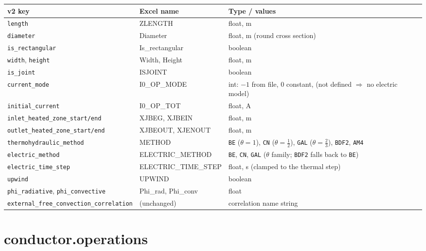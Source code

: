 \documentclass[10pt,a4paper]{article}
\newcommand{\code}[1]{\texttt{#1}}
\begin{document}
\begin{longtable}{p{4.6cm}p{3.4cm}p{7.2cm}}
\toprule
\textbf{v2 key} & \textbf{Excel name} & \textbf{Type / values} \\
\midrule
\endhead
\code{length} & ZLENGTH & float, m \\
\code{diameter} & Diameter & float, m (round cross section) \\
\code{is\_rectangular} & Is\_rectangular & boolean \\
\code{width}, \code{height} & Width, Height & float, m \\
\code{is\_joint} & ISJOINT & boolean \\
\code{current\_mode} & I0\_OP\_MODE & int: $-1$ from file, $0$ constant, (not defined $\Rightarrow$ no electric model) \\
\code{initial\_current} & I0\_OP\_TOT & float, A \\
\code{inlet\_heated\_zone\_start/\allowbreak end} & XJBEG, XJBEIN & float, m \\
\code{outlet\_heated\_zone\_start/\allowbreak end} & XJBEOUT, XJENOUT & float, m \\
\code{thermohydraulic\_method} & METHOD & \code{BE} ($\theta{=}1$), \code{CN} ($\theta{=}\tfrac12$), \code{GAL} ($\theta{=}\tfrac23$), \code{BDF2}, \code{AM4} \\
\code{electric\_method} & ELECTRIC\_METHOD & \code{BE}, \code{CN}, \code{GAL} ($\theta$ family; \code{BDF2} falls back to \code{BE}) \\
\code{electric\_time\_step} & ELECTRIC\_TIME\_STEP & float, s (clamped to the thermal step) \\
\code{upwind} & UPWIND & boolean \\
\code{phi\_radiative}, \code{phi\_convective} & Phi\_rad, Phi\_conv & float \\
\code{external\_free\_convection\_correlation} & (unchanged) & correlation name string \\
\bottomrule
\end{longtable}

\section*{conductor.operations}
\end{document}
